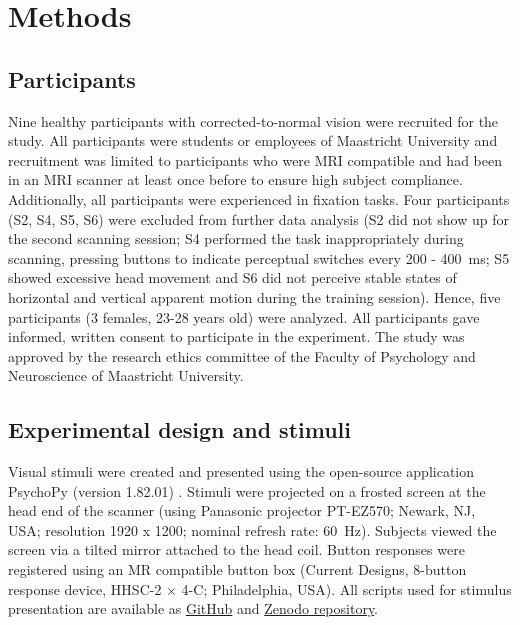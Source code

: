 \section{Methods}
\subsection{Participants}
Nine healthy participants with corrected-to-normal vision were recruited for the study. All participants were students or employees of Maastricht University and recruitment was limited to participants who were MRI compatible and had been in an MRI scanner at least once before to ensure high subject compliance. Additionally, all participants were experienced in fixation tasks. Four participants (S2, S4, S5, S6) were excluded from further data analysis (S2 did not show up for the second scanning session; S4 performed the task inappropriately during scanning, pressing buttons to indicate perceptual switches every 200 - 400~ms; S5 showed excessive head movement and S6 did not perceive stable states of horizontal and vertical apparent motion during the training session). Hence, five participants (3 females, 23-28 years old) were analyzed. All participants gave informed, written consent to participate in the experiment. The study was approved by the research ethics committee of the Faculty of Psychology and Neuroscience of Maastricht University.

\subsection{Experimental design and stimuli}
Visual stimuli were created and presented using the open-source application PsychoPy (version 1.82.01) \parencite{Peirce2007,Peirce2008}. Stimuli were projected on a frosted screen at the head end of the scanner (using Panasonic projector PT-EZ570; Newark, NJ, USA; resolution 1920 x 1200; nominal refresh rate: 60~Hz). Subjects viewed the screen via a tilted mirror attached to the head coil. Button responses were registered using an MR compatible button box (Current Designs, 8-button response device, HHSC-2 × 4-C; Philadelphia, USA). All scripts used for stimulus presentation are available as \href{https://github.com/MSchnei/motion_quartet_scripts}{GitHub} and \href{https://zenodo.org/record/1489246}{Zenodo repository}.

